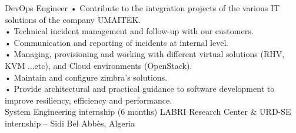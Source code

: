 \documentclass{cv}
\begin{document}
{\keeneye}
{DevOps Engineer}
    • Contribute to the integration projects of the various IT solutions of the company UMAITEK.\\
    • Technical incident management and follow-up with our customers.\\
    • Communication and reporting of incidents at internal level.\\
    • Managing, provisioning and working with different virtual solutions (RHV, KVM ...etc), and Cloud environments (OpenStack). \\
    • Maintain and configure zimbra's solutions.\\
    • Provide architectural and practical guidance to software development to improve resiliency, efficiency and performance.\\
    {System Engineering internship (6 months)
    }
    {LABRI Research Center  \& URD-SE internship -- Sidi Bel Abbès, Algeria\vspace{.2cm}}
\end{document}

